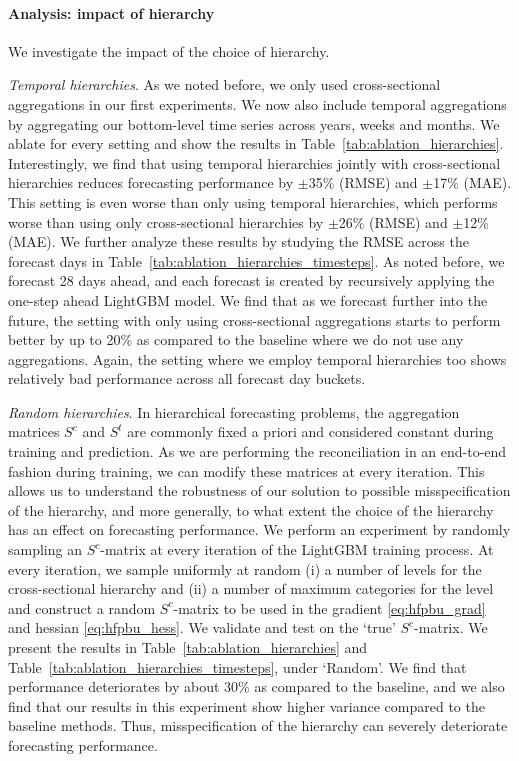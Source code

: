 \documentclass[preprint, 3p, times, twocolumn]{elsarticle}
\begin{document}
  \paragraph{Analysis: impact of hierarchy} We investigate the impact of the choice of hierarchy. 
  
  \textit{Temporal hierarchies}. As we noted before, we only used cross-sectional aggregations in our first experiments. We now also include temporal aggregations by aggregating our bottom-level time series across years, weeks and months. We ablate for every setting and show the results in Table~\ref{tab:ablation_hierarchies}. Interestingly, we find that using temporal hierarchies jointly with cross-sectional hierarchies reduces forecasting performance by $\pm$35\% (RMSE) and $\pm$17\% (MAE). This setting is even worse than only using temporal hierarchies, which performs worse than using only cross-sectional hierarchies by $\pm$26\% (RMSE) and $\pm$12\% (MAE). We further analyze these results by studying the RMSE across the forecast days in Table~\ref{tab:ablation_hierarchies_timesteps}. As noted before, we forecast 28 days ahead, and each forecast is created by recursively applying the one-step ahead LightGBM model. We find that as we forecast further into the future, the setting with only using cross-sectional aggregations starts to perform better by up to 20\% as compared to the baseline where we do not use any aggregations. Again, the setting where we employ temporal hierarchies too shows relatively bad performance across all forecast day buckets.  
  
  \textit{Random hierarchies}. In hierarchical forecasting problems, the aggregation matrices \(S^c\) and \(S^t\) are commonly fixed a priori and considered constant during training and prediction. As we are performing the reconciliation in an end-to-end fashion during training, we can modify these matrices at every iteration. This allows us to understand the robustness of our solution to possible misspecification of the hierarchy, and more generally, to what extent the choice of the hierarchy has an effect on forecasting performance. We perform an experiment by randomly sampling an \(S^c\)-matrix at every iteration of the LightGBM training process. At every iteration, we sample uniformly at random (i) a number of levels for the cross-sectional hierarchy and (ii) a number of maximum categories for the level and construct a random \(S^c\)-matrix to be used in the gradient \eqref{eq:hfpbu_grad} and hessian \eqref{eq:hfpbu_hess}. We validate and test on the `true' \(S^c\)-matrix. We present the results in Table~\ref{tab:ablation_hierarchies} and Table~\ref{tab:ablation_hierarchies_timesteps}, under `Random'. We find that performance deteriorates by about 30\% as compared to the baseline, and we also find that our results in this experiment show higher variance compared to the baseline methods. Thus, misspecification of the hierarchy can severely deteriorate forecasting performance.
  
\end{document}
